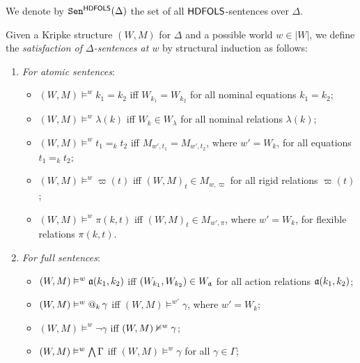 \documentclass[a4paper,UKenglish,cleveref,autoref]{lipics-v2019}
\begin{document}
We denote by \(\mathtt{Sen}^{{\mathsf{HDFOLS}}}(\Delta)\) the set of all \({\mathsf{HDFOLS}}\)-sentences over \(\Delta\).

Given a Kripke structure \((W, M)\) for \(\Delta\) and a possible world \(w \in |W|\), we define the \emph{satisfaction of \(\Delta\)-sentences at \(w\)} by structural induction as follows:
\begin{enumerate}

\item \emph{For atomic sentences}:
  \begin{itemize}

  \item \((W, M) \models^{w} k_{1} = k_{2}\) iff \(W_{k_{1}} = W_{k_{2}}\) for all nominal equations \(k_{1} = k_{2}\);

  \item \((W, M) \models^{w} \lambda(k)\) iff \(W_{k} \in W_{\lambda}\) for all nominal relations \(\lambda(k)\);

  \item \((W, M) \models^{w} t_{1} =_{k} t_{2}\) iff \(M_{w', t_{1}} = M_{w', t_{2}}\), where \(w' = W_{k}\), for all equations \(t_{1} =_{k} t_{2}\);

  \item \((W, M) \models^{w} \varpi(t)\) iff \((W, M)_t \in M_{w,\varpi}\) for all rigid relations \(\varpi(t)\);

  \item \((W, M) \models^{w} \pi(k, t)\) iff \((W, M)_t \in M_{w',\pi}\), where \(w' = W_{k}\), for flexible relations \(\pi(k, t)\).

  \end{itemize}

\item \emph{For full sentences}:
  \begin{itemize}

  \item \((W, M) \vDash^{w} \mathfrak{a}(k_{1}, k_{2})\) iff \((W_{k_{1}}, W_{k_{2}}) \in W_{\mathfrak{a}}\) for all action relations \(\mathfrak{a}(k_{1}, k_{2})\);

  \item \((W, M) \vDash^{w} @_{k}\, \gamma\) iff \((W, M) \models^{w'} \gamma\), where \(w' = W_{k}\);

  \item \((W, M) \models^{w} \neg \gamma\) iff \((W, M) \nvDash^{w} \gamma\);

  \item \((W, M) \vDash^{w} \textstyle\bigwedge \Gamma\) iff \((W, M) \models^{w} \gamma\) for all \(\gamma \in \Gamma\); 


\end{itemize}
\end{enumerate}
\end{document}
